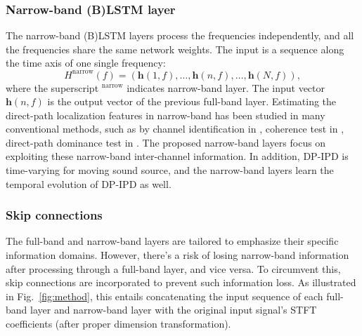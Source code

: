 \documentclass[lettersize,journal]{IEEEtran}
\begin{document}
\subsubsection{Narrow-band (B)LSTM layer}
The narrow-band (B)LSTM layers process the frequencies independently, and all the frequencies share the same network weights. The input is a sequence along the time axis of one single frequency: 
\begin{equation}
    H^{\text{narrow}}(f) = (\mathbf{h}(1,f), \dots,\mathbf{h}(n,f), \dots , \mathbf{h}(N,f)),
\end{equation}
where the superscript $^{\text{narrow}}$ indicates narrow-band layer. The input vector $\mathbf{h}(n,f)$ is the output vector of the previous full-band layer. Estimating the direct-path localization features in narrow-band has been studied in many conventional methods, such as by channel identification in \cite{7533416}, coherence test in \cite{Mohan2008LocalizationOM}, direct-path dominance test in \cite{Nadiri2014LocalizationOM}. The proposed narrow-band layers focus on exploiting these narrow-band inter-channel information. In addition, DP-IPD is time-varying for moving sound source, and the narrow-band layers learn the temporal evolution of DP-IPD as well.
\subsubsection{Skip connections}  
The full-band and narrow-band layers are tailored to emphasize their specific information domains. However, there's a risk of losing narrow-band information after processing through a full-band layer, and vice versa. To circumvent this, skip connections are incorporated to prevent such information loss. As illustrated in Fig.~\ref{fig:method}, this entails concatenating the input sequence of each full-band layer and narrow-band layer with the original input signal's STFT coefficients (after proper dimension transformation).
\end{document}
